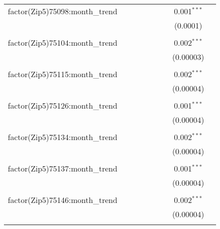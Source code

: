 \begin{table}[H]
{\begin{tabular}{@{\extracolsep{5pt}}lcccccccc}
  factor(Zip5)75098:month\_trend &  &  &  &  &  &  & 0.001$^{***}$ &  \\  

   &  &  &  &  &  &  & (0.0001) &  \\  

   & & & & & & & & \\  

  factor(Zip5)75104:month\_trend &  &  &  &  &  &  & 0.002$^{***}$ &  \\  

   &  &  &  &  &  &  & (0.00003) &  \\  

   & & & & & & & & \\  

  factor(Zip5)75115:month\_trend &  &  &  &  &  &  & 0.002$^{***}$ &  \\  

   &  &  &  &  &  &  & (0.00004) &  \\  

   & & & & & & & & \\  

  factor(Zip5)75126:month\_trend &  &  &  &  &  &  & 0.001$^{***}$ &  \\  

   &  &  &  &  &  &  & (0.00004) &  \\  

   & & & & & & & & \\  

  factor(Zip5)75134:month\_trend &  &  &  &  &  &  & 0.002$^{***}$ &  \\  

   &  &  &  &  &  &  & (0.00004) &  \\  

   & & & & & & & & \\  

  factor(Zip5)75137:month\_trend &  &  &  &  &  &  & 0.001$^{***}$ &  \\  

   &  &  &  &  &  &  & (0.00004) &  \\  

   & & & & & & & & \\  

  factor(Zip5)75146:month\_trend &  &  &  &  &  &  & 0.002$^{***}$ &  \\  

   &  &  &  &  &  &  & (0.00004) &  \\  

   & & & & & & & & \\  


\end{tabular}}
\end{table}
